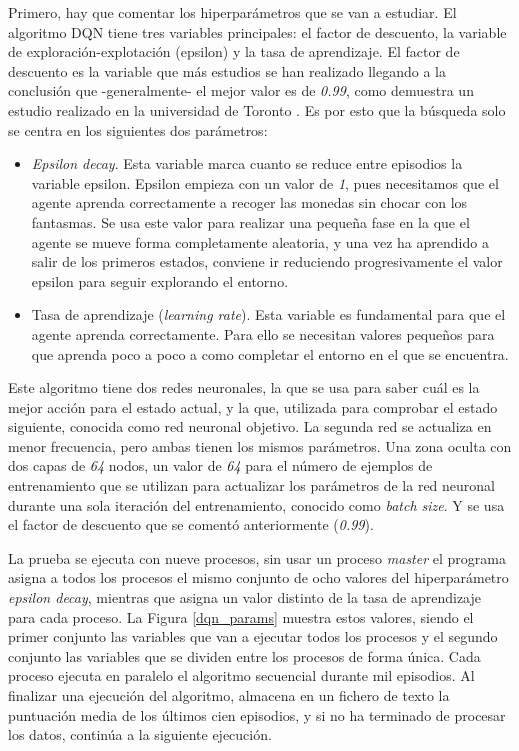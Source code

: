 			Primero, hay que comentar los hiperparámetros que se van a estudiar. El algoritmo DQN tiene tres variables principales: el factor de descuento, la variable de exploración-explotación (epsilon) y la tasa de aprendizaje. El factor de descuento es la variable que más estudios se han realizado llegando a la conclusión que -generalmente- el mejor valor es de \textit{0.99}, como demuestra un estudio realizado en la universidad de Toronto \cite{pitis2019rethinking}. Es por esto que la búsqueda solo se centra en los siguientes dos parámetros:
			
			\begin{itemize}
				\item \textit{Epsilon decay}. Esta variable marca cuanto se reduce entre episodios la variable epsilon. Epsilon empieza con un valor de \textit{1}, pues necesitamos que el agente aprenda correctamente a recoger las monedas sin chocar con los fantasmas. Se usa este valor para realizar una pequeña fase en la que el agente se mueve forma completamente aleatoria, y una vez ha aprendido a salir de los primeros estados, conviene ir reduciendo progresivamente el valor epsilon para seguir explorando el entorno. 
				
				\item Tasa de aprendizaje (\textit{learning rate}). Esta variable es fundamental para que el agente aprenda correctamente. Para ello se necesitan valores pequeños para que aprenda poco a poco a como completar el entorno en el que se encuentra.
			\end{itemize}
			
			Este algoritmo tiene dos redes neuronales, la que se usa para saber cuál es la mejor acción para el estado actual, y la que, utilizada para comprobar el estado siguiente, conocida como red neuronal objetivo. La segunda red se actualiza en menor frecuencia, pero ambas tienen los mismos parámetros. Una zona oculta con dos capas de \textit{64} nodos, un valor de \textit{64} para el número de ejemplos de entrenamiento que se utilizan para actualizar los parámetros de la red neuronal durante una sola iteración del entrenamiento, conocido como \textit{batch size}. Y se usa el factor de descuento que se comentó anteriormente (\textit{0.99}). 				
			
			
			La prueba se ejecuta con nueve procesos, sin usar un proceso \textit{master} el programa asigna a todos los procesos el mismo conjunto de ocho valores del hiperparámetro \textit{epsilon decay}, mientras que asigna un valor distinto de la tasa de aprendizaje para cada proceso. La Figura \ref{dqn_params} muestra estos valores, siendo el primer conjunto las variables que van a ejecutar todos los procesos y el segundo conjunto las variables que se dividen entre los procesos de forma única. Cada proceso ejecuta en paralelo el algoritmo secuencial durante mil episodios. Al finalizar una ejecución del algoritmo, almacena en un fichero de texto la puntuación media de los últimos cien episodios, y si no ha terminado de procesar los datos, continúa a la siguiente ejecución.
			
